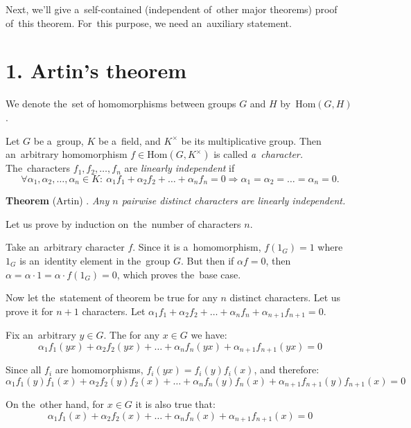 \documentclass[twoside]{article}
\begin{document}
Next, we'll give a~self-contained (independent of~other major theorems) proof of~this theorem.
For~this purpose, we need an~auxiliary statement.

\section*{1. Artin's theorem}
We denote the~set of homomorphisms between groups $G$ and $H$ by~$\mathrm{Hom}(G, H)$.

Let $G$ be a~group, $K$ be a~field, and $K^{\times}$ be its multiplicative group. Then an~arbitrary
homomorphism $f \in \mathrm{Hom}(G, K^{\times})$ is called \textit{a~character.} The~characters $f_1, f_2, \ldots, f_n$
are \textit{linearly independent} if
$$
    \forall \alpha_1, \alpha_2, \ldots, \alpha_n \in K{:}\ \alpha_1 f_1 + \alpha_2 f_2 + \ldots + \alpha_n f_n = 0 \Rightarrow \alpha_1 = \alpha_2 = \ldots = \alpha_n = 0.
$$

\noindent\textbf{Theorem} (Artin) \cite{Art48}.\emph{
    Any $n$ pairwise distinct characters are linearly independent.
}\medskip

    Let us prove by induction on~the~number of characters $n$.

    Take an~arbitrary character $f$. Since it is a~homomorphism, $f(1_G) = 1$
    where $1_G$ is an~identity element in the~group $G$. But then if $\alpha f = 0$, then
    $\alpha = \alpha \cdot 1 = \alpha \cdot f(1_G) = 0$, which proves the~base case.

    Now let the~statement of theorem be true for any $n$ distinct characters. Let us prove
    it for $n + 1$ characters. Let $\alpha_1 f_1 + \alpha_2 f_2 + \ldots + \alpha_n f_n + \alpha_{n + 1} f_{n + 1} = 0$.

    Fix an~arbitrary $y \in G$. The for any $x \in G$ we have:
    \begin{equation}\label{Artin:first}
        \alpha_1 f_1(yx) + \alpha_2 f_2(yx) + \ldots + \alpha_n f_n(yx) + \alpha_{n + 1} f_{n + 1}(yx) = 0
    \end{equation}

    Since all $f_i$ are homomorphisms, $f_i(yx) = f_i(y) f_i(x)$, and therefore:
    $$
        \alpha_1 f_1(y) f_1(x) + \alpha_2 f_2(y) f_2(x) + \ldots + \alpha_n f_n(y) f_n(x) + \alpha_{n + 1} f_{n + 1}(y) f_{n + 1}(x) = 0
    $$

    On the~other hand, for $x \in G$ it is also true that:
    $$
        \alpha_1 f_1(x) + \alpha_2 f_2(x) + \ldots + \alpha_n f_n(x) + \alpha_{n + 1} f_{n + 1}(x) = 0
    $$
\end{document}
